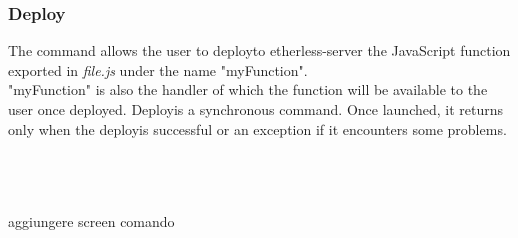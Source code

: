 \subsubsection{Deploy\glo}
The command allows the user to deploy\glo to etherless-server the JavaScript function exported in \textit{file.js} under the name "myFunction".\\
"myFunction" is also the handler of which the function will be available to the user once deployed. Deploy\glo is a synchronous command. Once launched, it returns only when the deploy\glo is successful or an exception if it encounters some problems.\\
\\
\centerline{}\\
\\
aggiungere screen comando
